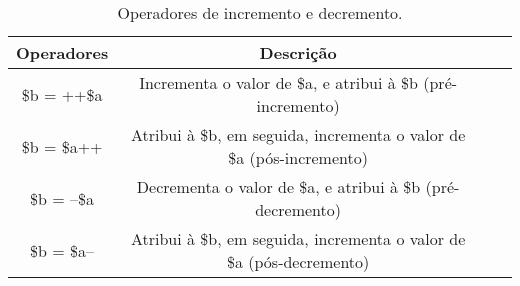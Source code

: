 \begin{table}[h]
\caption{Operadores de incremento e decremento.}\label{tab:cap4-operadores-incremento-e-decremento}
\begin{center}
\begin{tabular}{|c|c|c|c|}
\hline
  \multicolumn{1}{|c|}{ \textbf{Operadores}}
&  \multicolumn{1}{|c|}{ \textbf{Descrição}} \\
\hline
\hline
\$b = ++\$a             & Incrementa o valor de \$a, e atribui à \$b (pré-incremento)  \\ \hline
\$b = \$a++             & Atribui à \$b, em seguida, incrementa o valor de \$a (pós-incremento)  \\ \hline
\$b = --\$a             & Decrementa o valor de \$a, e atribui à \$b (pré-decremento)  \\ \hline
\$b = \$a--             & Atribui à \$b, em seguida, incrementa o valor de \$a (pós-decremento)  \\ \hline
\end{tabular}
\end{center}
\end{table}

